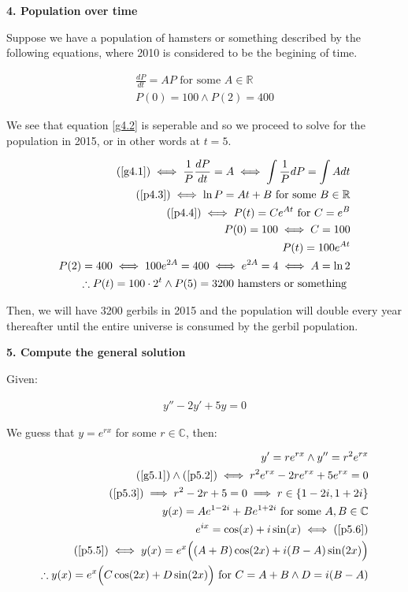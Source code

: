 \documentclass[12pt]{article}
\newcommand{\reals}{\mathbb{R}}
\newcommand{\cplx}{\mathbb{C}}
\begin{document}
\medskip

\textbf{4. Population over time}

Suppose we have a population of hamsters or something described by the following equations,
where 2010 is considered to be the begining of time.

\begin{align}
	\label{g4.1}
	\frac{dP}{dt} = AP \textrm{ for some } A \in \reals \\
	\label{g4.2}
	P(0) = 100 \land P(2) = 400
\end{align}

We see that equation \ref{g4.2} is seperable
and so we proceed to solve for the population in 2015,
or in other words at $t = 5$.

\begin{align}
	\label{p4.3}
	(\ref{g4.1}) \iff \frac{1}{P} \frac{dP}{dt} = A \iff \int \frac{1}{P} dP = \int A dt \\
	\label{p4.4}
	(\ref{p4.3}) \iff \ln P = At + B \textrm{ for some } B \in \reals \\
	(\ref{p4.4}) \iff P(t) = Ce^{At} \textrm{ for } C = e^B \\
	P(0) = 100 \iff C = 100 \\
	P(t) = 100e^{At} \\
	P(2) = 400 \iff 100e^{2A} = 400 \iff e^{2A} = 4 \iff A = \ln 2 \\
	\therefore P(t) = 100 \cdot 2^t \land P(5) = 3200 \textrm{ hamsters or something }
\end{align}

Then, we will have 3200 gerbils in 2015 and the population will double every year thereafter
until the entire universe is consumed by the gerbil population.

\pagebreak

\textbf{5. Compute the general solution}

Given:

\begin{align}
	\label{g5.1}
	y'' - 2y' + 5y = 0
\end{align}

We guess that $y = e^{rx}$ for some $r \in \cplx$, then:

\begin{align}
	\label{p5.2}
	y' = re^{rx} \land y'' = r^2e^{rx} \\
	\label{p5.3}
	(\ref{g5.1}) \land (\ref{p5.2}) \iff r^2e^{rx} - 2re^{rx} + 5e^{rx} = 0 \\
	\label{p5.4}
	(\ref{p5.3}) \implies r^2 - 2r + 5 = 0 \implies r \in \{ 1-2i, 1+2i \} \\
	y(x) = Ae^{1-2i} + Be^{1+2i} \textrm{ for some } A,B \in \cplx \\
	\label{p5.5}
	e^{ix} = \cos(x) + i \sin(x) \iff (\ref{p5.6}) \\
	\label{p5.6}
	(\ref{p5.5}) \iff y(x) = e^x\Big((A+B)\cos(2x) + i(B-A)\sin(2x)\Big) \\
	\therefore y(x) = e^x\Big(C\cos(2x) + D\sin(2x)\Big) \textrm{ for } C = A + B \land D = i(B-A)
\end{align}
\end{document}
